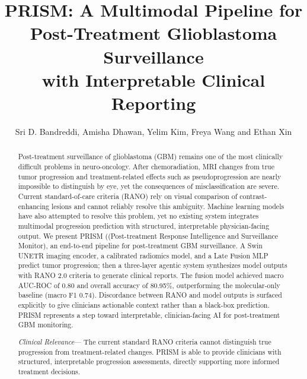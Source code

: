 \documentclass[letterpaper, 10pt, conference]{IEEEtran}
\begin{document}
\title{PRISM: A Multimodal Pipeline for\\ Post-Treatment Glioblastoma Surveillance\\ with Interpretable Clinical Reporting}

\author{Sri D. Bandreddi, Amisha Dhawan, Yelim Kim, Freya Wang and Ethan Xin}

\maketitle

\begin{abstract}
Post-treatment surveillance of glioblastoma (GBM) remains one of the most clinically difficult problems in
neuro-oncology. After chemoradiation, MRI changes from true tumor progression and treatment-related effects such as
pseudoprogression are nearly impossible to distinguish by eye, yet the consequences of misclassification are severe.
Current standard-of-care criteria (RANO) rely on visual comparison of contrast-enhancing lesions and cannot reliably
resolve this ambiguity. Machine learning models have also attempted to resolve this problem, yet no existing system
integrates multimodal progression prediction with structured, interpretable physician-facing output. We present PRISM
((Post-treatment Response Intelligence and Surveillance Monitor), an end-to-end pipeline for post-treatment GBM
surveillance. A Swin UNETR imaging encoder, a calibrated radiomics model, and a Late Fusion MLP predict tumor
progression; then a three-layer agentic system synthesizes model outputs with RANO 2.0 criteria to generate clinical
reports. The fusion model achieved macro AUC-ROC of 0.80 and overall accuracy of 80.95\%, outperforming the
molecular-only baseline (macro F1 0.74). Discordance between RANO and model outputs is surfaced explicitly to give
clinicians actionable context rather than a black-box prediction. PRISM represents a step toward interpretable,
clinician-facing AI for post-treatment GBM monitoring.

\vspace{1em}
\textit{Clinical Relevance}--- The current standard RANO criteria cannot distinguish true progression from
treatment-related changes. PRISM is able to provide clinicians with structured, interpretable progression assessments,
directly supporting more informed treatment decisions.
\end{abstract}
\end{document}
